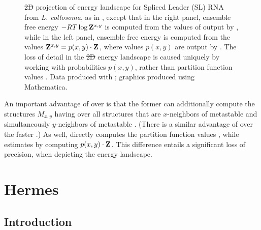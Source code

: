 \documentclass[11pt, oneside]{Thesis} %
\providecommand{\DIFdel}[1]{{\protect\color{red}\sout{#1}}}                      %
\providecommand{\DIFdelFL}[1]{\DIFdel{#1}} %
\providecommand{\DIFaddbeginFL}{} %
\providecommand{\DIFaddendFL}{} %
\providecommand{\DIFdelbeginFL}{} %
\providecommand{\DIFdelendFL}{} %
\begin{document}
\begin{figure}[!ht]
\DIFdelendFL \DIFaddbeginFL \caption[\twoD projection of energy landscape for Spliced Leader (SL) RNA
from {\em L. collosoma}, as in
,
except that in the right panel, ensemble free energy $-RT \log \bfZ{x,y}{}$
is computed from the values of  output by \rnatwofold,
while in the left panel, ensemble free energy is computed from
the values $\bfZ{x,y}{}=p(x,y) \cdot \fullZ$, where values $p(x,y)$ are output
by \rnatwofold]{\DIFaddendFL 
\DIFdelbeginFL \DIFdelFL{2D }\DIFdelendFL \DIFaddbeginFL \twoD \DIFaddendFL projection of energy landscape for Spliced Leader (SL) RNA
from {\em L. collosoma}, as in
,
except that in the right panel, ensemble free energy $-RT \log \bfZ{x,y}{}$
is computed from the values of  output by \rnatwofold,
while in the left panel, ensemble free energy is computed from
the values $\bfZ{x,y}{}=p(x,y) \cdot \fullZ$, where values $p(x,y)$ are output
by \rnatwofold.
The loss of detail in the \DIFdelbeginFL \DIFdelFL{2D }\DIFdelendFL \DIFaddbeginFL \twoD \DIFaddendFL energy landscape is caused uniquely by
working with probabilities $p(x,y)$, rather than partition function
values .
Data produced with \rnatwofold; graphics produced using Mathematica.
}
\label{fig:ffttwo:rtwofoldProbContour}
\end{figure}

An important advantage of
\rnatwofold over \ffttwo is that the former can additionally
compute the structures $M_{x,y}$ having \mfe over all
structures that are $x$-neighbors of metastable \strA and simultaneously
$y$-neighbors of metastable \strB. (There is a similar advantage of \rnabor
\citep{freyhult.b07} over the faster \fftbor \citep{senter.po12}.)
As well, \rnatwofold directly computes the partition function values
, while \ffttwo estimates  by computing
$p(x,y) \cdot {\bf Z}^{}_{}$. This difference entails a significant loss of precision,
when depicting the energy landscape.


\chapter{Hermes}
\label{ch:hermes}


\section{Introduction}
\label{sec:hermes:intro}
\end{document}
